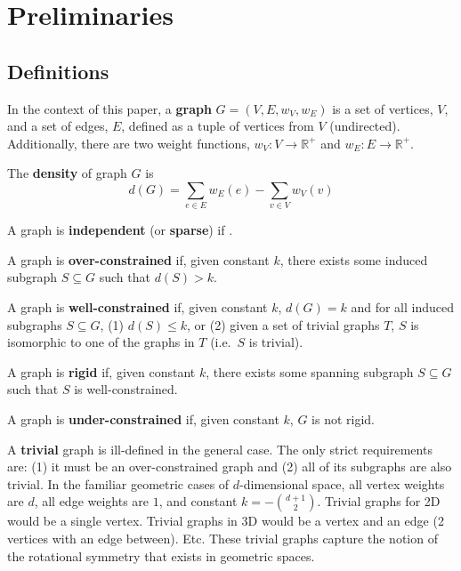 \section{Preliminaries}

\subsection{Definitions}

In the context of this paper, a \textbf{graph} $G=(V,E,w_V,w_E)$ is a set of vertices, $V$, and a set of edges, $E$, defined as a tuple of vertices from $V$ (undirected). Additionally, there are two weight functions, $w_V: V \to \mathbb{R}^+$ and $w_E: E \to \mathbb{R}^+$.

The \textbf{density} of graph $G$ is
\begin{equation}
    d(G) = \sum_{e\in E}{w_E(e)} - \sum_{v\in V}{w_V(v)}
\end{equation}

A graph is \textbf{independent} (or \textbf{sparse}) if .

A graph is \textbf{over-constrained} if, given constant $k$, there exists some induced subgraph $S\subseteq G$ such that $d(S) > k$.

A graph is \textbf{well-constrained} if, given constant $k$, $d(G) = k$ and for all induced subgraphs $S\subseteq G$, (1) $d(S)\leq k$, or (2) given a set of trivial graphs $T$, $S$ is isomorphic to one of the graphs in $T$ (i.e.\ $S$ is trivial).

A graph is \textbf{rigid} if, given constant $k$, there exists some spanning subgraph $S\subseteq G$ such that $S$ is well-constrained.

A graph is \textbf{under-constrained} if, given constant $k$, $G$ is not rigid.

A \textbf{trivial} graph is ill-defined in the general case. The only strict requirements are: (1) it must be an over-constrained graph and (2) all of its subgraphs are also trivial.
In the familiar geometric cases of $d$-dimensional space, all vertex weights are $d$, all edge weights are $1$, and constant $k= -{{d+1}\choose{2}}$. Trivial graphs for 2D would be a single vertex. Trivial graphs in 3D would be a vertex and an edge (2 vertices with an edge between). Etc. These trivial graphs capture the notion of the rotational symmetry that exists in geometric spaces.

